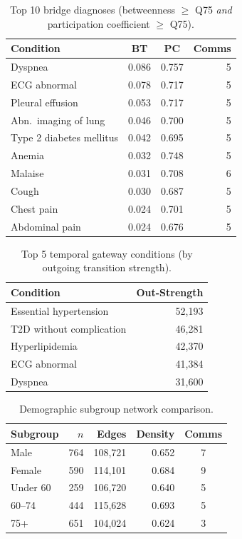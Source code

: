 \documentclass[10pt,twocolumn]{article}
\begin{document}
\begin{table}[!htbp]
\centering
\caption{Top 10 bridge diagnoses (betweenness $\geq$ Q75 \textit{and} participation coefficient $\geq$ Q75).}
\label{tab:bridges}
\small
\begin{tabular}{lccr}
\toprule
\textbf{Condition} & \textbf{BT} & \textbf{PC} & \textbf{Comms} \\
\midrule
Dyspnea & 0.086 & 0.757 & 5 \\
ECG abnormal & 0.078 & 0.717 & 5 \\
Pleural effusion & 0.053 & 0.717 & 5 \\
Abn.\ imaging of lung & 0.046 & 0.700 & 5 \\
Type 2 diabetes mellitus & 0.042 & 0.695 & 5 \\
Anemia & 0.032 & 0.748 & 5 \\
Malaise & 0.031 & 0.708 & 6 \\
Cough & 0.030 & 0.687 & 5 \\
Chest pain & 0.024 & 0.701 & 5 \\
Abdominal pain & 0.024 & 0.676 & 5 \\
\bottomrule
\end{tabular}
\end{table}

\begin{table}[!htbp]
\centering
\caption{Top 5 temporal gateway conditions (by outgoing transition strength).}
\label{tab:gateways}
\small
\begin{tabular}{lr}
\toprule
\textbf{Condition} & \textbf{Out-Strength} \\
\midrule
Essential hypertension & 52,193 \\
T2D without complication & 46,281 \\
Hyperlipidemia & 42,370 \\
ECG abnormal & 41,384 \\
Dyspnea & 31,600 \\
\bottomrule
\end{tabular}
\end{table}

\begin{table}[!htbp]
\centering
\caption{Demographic subgroup network comparison.}
\label{tab:subgroups}
\small
\begin{tabular}{lrrrc}
\toprule
\textbf{Subgroup} & \textbf{$n$} & \textbf{Edges} & \textbf{Density} & \textbf{Comms} \\
\midrule
Male & 764 & 108,721 & 0.652 & 7 \\
Female & 590 & 114,101 & 0.684 & 9 \\
Under 60 & 259 & 106,720 & 0.640 & 5 \\
60--74 & 444 & 115,628 & 0.693 & 5 \\
75+ & 651 & 104,024 & 0.624 & 3 \\
\bottomrule
\end{tabular}
\end{table}
\end{document}
